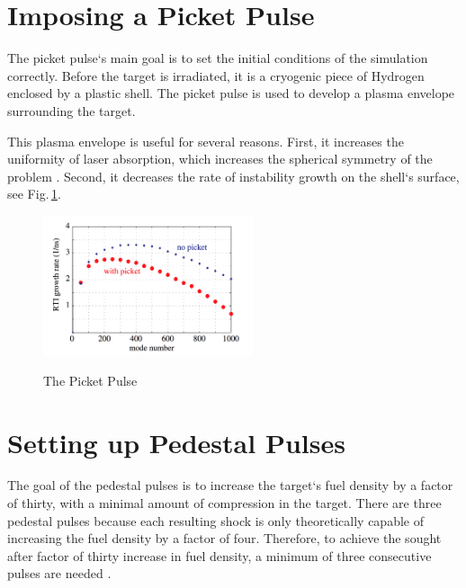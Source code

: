 
  \section{Imposing a Picket Pulse}

The picket pulse`s main goal is to set the initial conditions of the simulation correctly.  Before the target is irradiated, it is a cryogenic piece of Hydrogen enclosed by a plastic shell.  The picket pulse is used to develop a plasma envelope surrounding the target.

This plasma envelope is useful for several reasons.  First, it increases the uniformity of laser absorption, which increases the spherical symmetry of the problem \citep{terryPaper}.  Second, it decreases the rate of instability growth on the shell`s surface, see Fig.\,\ref{fig:picketEffect}.  


\begin{figure}	
	\centering
	\caption[The Picket Pulse]{The Picket Pulse \\  }
	\includegraphics[width=0.55\textwidth]{graphics/picketEffect.png} 
	\label{fig:picketEffect}
\end{figure}


  \section{Setting up Pedestal Pulses}
  \label{sec:pedestal}
The goal of the pedestal pulses is to increase the target`s fuel density by a factor of thirty, with a minimal amount of compression in the target. There are three pedestal pulses because each resulting shock is only theoretically capable of increasing the fuel density by a factor of four. Therefore, to achieve the sought after factor of thirty increase in fuel density, a minimum of three consecutive pulses are needed \citep{terryThesis}.  


